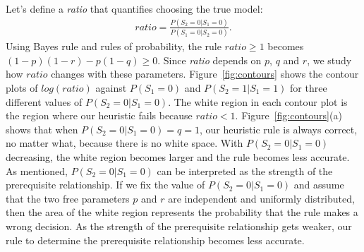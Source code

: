 \documentclass{edm_template}
\newcommand{\hl}[1]{\colorbox{yellow}{#1}}
\begin{document}
Let's define a \textit{ratio} that quantifies choosing the true model:
\begin{align}
ratio=\frac{P(S_2=0|S_1=0)}{P(S_1=0|S_2=0)}.
\end{align}
Using Bayes rule and rules of probability, the rule $ratio\ge 1$ becomes $(1-p)(1-r)-p(1-q)\ge 0$.
Since \textit{ratio} depends on $p$, $q$ and $r$, we study how $ratio$ changes with these parameters.
Figure~\ref{fig:contours} shows the contour plots of $log(ratio)$ against $P(S_1=0)$ and $P(S_2=1|S_1=1)$ for three different values of $P(S_2=0|S_1=0)$.
The white region in each contour plot is the region where our heuristic fails  because $ratio<1$. %
Figure~\ref{fig:contours}(a) shows that when $P(S_2=0|S_1=0)=q=1$, our heuristic rule is always correct, no matter what, because there is no white space. %
With $P(S_2=0|S_1=0)$ decreasing, the white region becomes larger and the rule becomes less accurate.
As mentioned, $P(S_2=0|S_1=0)$ can be interpreted as the strength of the prerequisite relationship. 
If we fix the value of $P(S_2=0|S_1=0)$ and assume that the two free parameters $p$ and $r$ are independent and uniformly distributed, then the area of the white region represents the probability that the rule makes a wrong decision.
As the strength of the prerequisite relationship  gets weaker, our  rule to determine the prerequisite relationship becomes less accurate.
\end{document}
